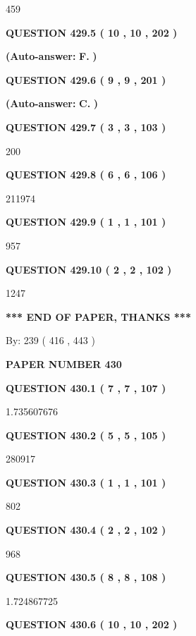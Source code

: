 \documentclass{ctexart}
\begin{document}
459
  
  
{\textbf{\large{QUESTION
429.5 
 ( 10 , 10 , 202 )
}}}
 
 
{\textbf{(Auto-answer:}}
{\textbf{\large{
F.}}}
{\textbf{)}}
 
 
  
  
{\textbf{\large{QUESTION
429.6 
 ( 9 , 9 , 201 )
}}}
 
 
{\textbf{(Auto-answer:}}
{\textbf{\large{
C.}}}
{\textbf{)}}
 
 
  
  
{\textbf{\large{QUESTION
429.7 
 ( 3 , 3 , 103 )
}}}

200
  
  
{\textbf{\large{QUESTION
429.8 
 ( 6 , 6 , 106 )
}}}

211974
  
  
{\textbf{\large{QUESTION
429.9 
 ( 1 , 1 , 101 )
}}}

957
  
  
{\textbf{\large{QUESTION
429.10 
 ( 2 , 2 , 102 )
}}}

1247
   
   
   
   
\vspace{1.0in} 
{\textbf{\large{ *** END OF PAPER, THANKS *** }}} 
   
   
\hspace{1.0in} By: 
 239 ( 416 ,  443 )
   
   
   
   
\newpage 
\setcounter{page}{ 
   430001 } 
   
   
 {\textbf{ \Large{ PAPER NUMBER  430  }}}
   
   
   
   
  
  
{\textbf{\large{QUESTION
430.1 
 ( 7 , 7 , 107 )
}}}

1.735607676
  
  
{\textbf{\large{QUESTION
430.2 
 ( 5 , 5 , 105 )
}}}

280917
  
  
{\textbf{\large{QUESTION
430.3 
 ( 1 , 1 , 101 )
}}}

802
  
  
{\textbf{\large{QUESTION
430.4 
 ( 2 , 2 , 102 )
}}}

968
  
  
{\textbf{\large{QUESTION
430.5 
 ( 8 , 8 , 108 )
}}}

1.724867725
  
  
{\textbf{\large{QUESTION
430.6 
 ( 10 , 10 , 202 )
}}}
 
\end{document}
